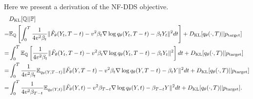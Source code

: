 \documentclass{article} %
\begin{document}
Here we present a derivation of the NF-DDS objective.
\begin{align}
   \nonumber & D_\text{KL}[\mathbb{Q}||\mathbb{P}]\\  \nonumber = &\mathbb{E}_{\mathbb{Q}} \left[
    \int_0^T \frac{1}{4v^2\beta_t}\|
   \tilde{F}_\theta(Y_t, T-t) - v^2\beta_{t} \nabla\log q_\theta(Y_t, T-t) - \beta_t Y_t
    \|^2 dt
    \right] + D_\text{KL}[q_\theta(\cdot, T)|| p_\text{target}]\\ \nonumber 
   = & 
    \int_0^T \mathbb{E}_{\mathbb{Q}} \left[\frac{1}{4v^2\beta_t}\|
   \tilde{F}_\theta(Y_t, T-t) - v^2\beta_{t} \nabla\log q_\theta(Y_t, T-t) - \beta_t Y_t
    \|^2\right] dt+ D_\text{KL}[q_\theta(\cdot, T)|| p_\text{target}]\\ \nonumber 
   = & 
    \int_0^T \frac{1}{4v^2\beta_t}\mathbb{E}_{{q_\theta(Y, T-t)}}\|
   \tilde{F}_\theta(Y, T-t) - v^2\beta_{t} \nabla\log q_\theta(Y, T-t) - \beta_t Y
    \|^2 dt+ D_\text{KL}[q_\theta(\cdot, T)|| p_\text{target}]\\
  = &
    \int_0^T \frac{1}{4v^2\beta_{T-t}} \mathbb{E}_{{q_\theta(Y, t)}} \|
   \tilde{F}_\theta(Y, t) - v^2\beta_{T-t} \nabla\log q_\theta(Y, t) - \beta_{T-t} Y
    \|^2 dt+ D_\text{KL}[q_\theta(\cdot, T)|| p_\text{target}].\label{eq:flowDDS-obj_appendix}
\end{align}
\end{document}
